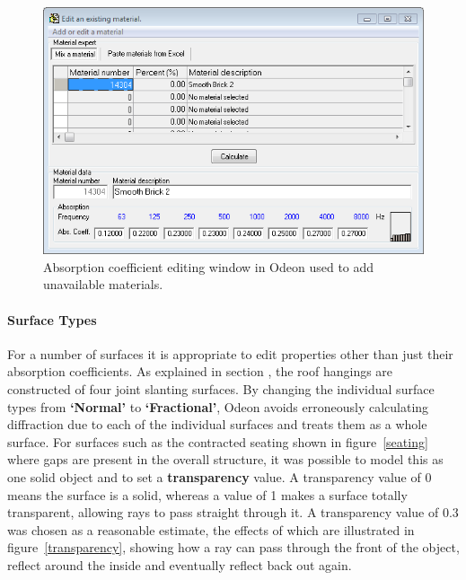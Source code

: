 \documentclass[../../main.tex]{subfiles}
\begin{document}
			\begin{figure}[H]
				\centerline{\includegraphics[width=\textwidth]{Sections/Implementation/Odeon/images/Absorption.PNG}}
				\caption{Absorption coefficient editing window in Odeon used to add unavailable materials.}
				\label{materialEdit}
			\end{figure}

		\paragraph{Surface Types}
			\label{surfaceTypes}

			For a number of surfaces it is appropriate to edit properties other than just their absorption coefficients. As explained in section , the roof hangings are constructed of four joint slanting surfaces. By changing the individual surface types from \textbf{`Normal'} to \textbf{`Fractional'}, Odeon avoids erroneously calculating diffraction due to each of the individual surfaces and treats them as a whole surface. For surfaces such as the contracted seating shown in figure~\ref{seating} where gaps are present in the overall structure, it was possible to model this as one solid object and to set a \textbf{transparency} value. A transparency value of 0 means the surface is a solid, whereas a value of 1 makes a surface totally transparent, allowing rays to pass straight through it. A transparency value of 0.3 was chosen as a reasonable estimate, the effects of which are illustrated in figure~\ref{transparency}, showing how a ray can pass through the front of the object, reflect around the inside and eventually reflect back out again.
\end{document}
